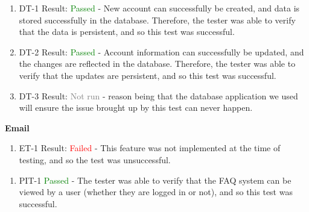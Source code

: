\documentclass[12pt, titlepage]{article}
\begin{document}
\begin{enumerate}
  \item DT-1
  Result: \textcolor{green}{Passed} - New account can successfully be created, and data is stored successfully in the database. Therefore, the tester was able to verify that the data is 
  persistent, and so this test was successful.
  \item DT-2
  Result: \textcolor{green}{Passed} - Account information can successfully be updated, and the changes are reflected in the database. Therefore, the tester was able to verify
  that the updates are persistent, and so this test was successful.
  \item DT-3
  Result: \textcolor{gray}{Not run} - reason being that the database application we used will ensure the issue brought up by this test can never happen.\\
\end{enumerate}

\noindent\large{\textbf{Email}}

\normalsize

\begin{enumerate}
  \item ET-1
  Result: \textcolor{red}{Failed} - This feature was not implemented at the time of testing, and so the test was unsuccessful.
\end{enumerate}


\normalsize

\begin{enumerate}
  \item PIT-1 \textcolor{green}{Passed} - The tester was able to verify that the FAQ system can be viewed by a user (whether they are logged in or not), and so this test was successful.\\
\end{enumerate}


\normalsize
\end{document}
